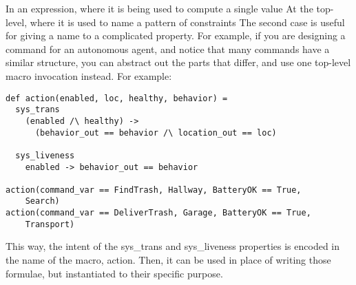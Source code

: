In an expression, where it is being used to compute a single value
At the top-level, where it is used to name a pattern of constraints
The second case is useful for giving a name to a complicated property. For example, if you are designing a command for an autonomous agent, and notice that many commands have a similar structure, you can abstract out the parts that differ, and use one top-level macro invocation instead. For example:

\begin{lstlisting}
def action(enabled, loc, healthy, behavior) =
  sys_trans
    (enabled /\ healthy) ->
      (behavior_out == behavior /\ location_out == loc)

  sys_liveness
    enabled -> behavior_out == behavior

action(command_var == FindTrash, Hallway, BatteryOK == True,
    Search)
action(command_var == DeliverTrash, Garage, BatteryOK == True,
    Transport)
\end{lstlisting}
This way, the intent of the sys\_trans and sys\_liveness properties is encoded in the name of the macro, action. Then, it can be used in place of writing those formulae, but instantiated to their specific purpose.

